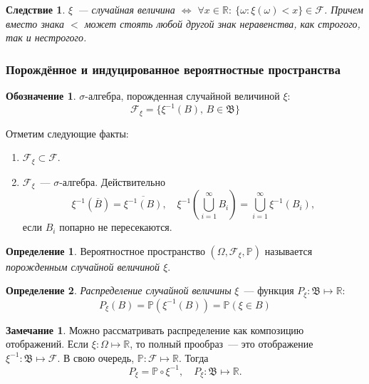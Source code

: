 \documentclass[oneside,final,14pt]{extreport}
\newcommand\myprob[1]{{\mathbb{P}(#1)}}
\theoremstyle{plain}
\newtheorem*{crlr}{Следствие}
\theoremstyle{definition}
\newtheorem*{defn}{Определение}
\newtheorem*{symb}{Обозначение}
\newtheorem*{rmrk}{Замечание}
\theoremstyle{named}
\begin{document}
\begin{crlr}
    $\xi$~--- случайная величина $\Leftrightarrow$ $\forall x \in \mathbb{R}:~ \{\omega \colon \xi(\omega) < x \} \in \mathcal{F}$. Причем вместо знака $<$ может стоять любой другой знак неравенства, как строгого, так и нестрогого.
\end{crlr}

\subsubsection{Порождённое и индуцированное вероятностные пространства}
\begin{symb}
    $\sigma\text{-алгебра}$, порожденная случайной величиной $\xi$:
    \begin{equation*}
        \mathcal{F}_\xi = \{\xi^{-1}(B), \, B \in \mathfrak{B} \}
    \end{equation*}
\end{symb}

Отметим следующие факты:
\begin{enumerate}
    \item $\mathcal{F}_\xi \subset \mathcal{F}.$
    \item $\mathcal{F}_\xi$~--- ${\sigma \text{-алгебра}}$. Действительно
    \begin{equation*}
        \xi^{-1}(\overline{B}) = \overline{\xi^{-1}(B)}, \quad
        \xi^{-1}\left(\bigcup\limits_{i=1}^{\infty}B_i\right) = \bigcup\limits_{i=1}^\infty \xi^{-1}(B_i),
    \end{equation*}
   если $B_i$ попарно не пересекаются.
\end{enumerate}

\begin{defn}
    Вероятностное пространство $(\Omega,\mathcal{F}_\xi,\mathbb{P})$ называется {\it порожденным случайной величиной $\xi$}.
\end{defn}

\begin{defn}
    {\it Распределение случайной величины} $\xi$~--- функция ${P_\xi: \mathfrak{B} \mapsto \mathbb{R}}$:
    \begin{equation*}
        P_\xi(B) = \myprob{\xi^{-1}(B)} = \myprob{\xi \in B}
    \end{equation*}
\end{defn}

\begin{rmrk}
    Можно рассматривать распределение как композицию отображений. Если $\xi: \Omega \mapsto \mathbb{R}$, то полный прообраз~--- это отображение $\xi^{-1}: \mathfrak{B} \mapsto \mathcal{F}$. В свою очередь, $\mathbb{P}: \mathcal{F} \mapsto \mathbb{R}$. Тогда
    \begin{equation*}
        P_{\xi} = \mathbb{P} \circ \xi^{-1}, \quad P_{\xi}: \mathfrak{B} \mapsto \mathbb{R}.
    \end{equation*}
\end{rmrk}
\end{document}
